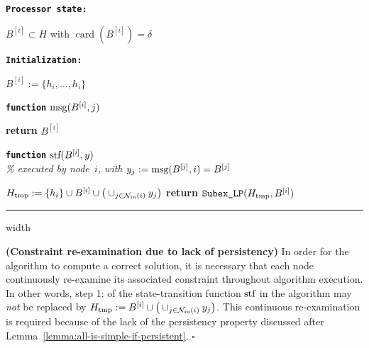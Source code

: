 \documentclass[onecolumn,journal,letterpaper]{IEEEtran}
\newcommand{\subscr}[2]{{#1}_{\textup{#2}}}
\newcommand{\union}{\cup}
\newcommand{\algofont}[1]{{\small\textsc{#1}}}
\newcommand{\card}{\ensuremath{\operatorname{card}}}
\newcommand{\subexLP}{\textup{\texttt{SUBEX\_lp}}}
\renewcommand{\subexLP}{\textup{\texttt{Subex\_LP}}}
\newcommand{\innbrs}{\subscr{\mathcal{N}}{in}}
\newcommand{\supind}[2]{{#1}^{[#2]}}
\newcommand{\msg}{\textup{msg}}
\newcommand{\stf}{\textup{stf}}
\newcommand\oprocendsymbol{\hbox{$\square$}}
\newcommand\oprocend{\relax\ifmmode\else\unskip\hfill\fi\oprocendsymbol}
\begin{document}
\noindent\begin{minipage}{0.44\linewidth}\textbf{\texttt{Processor state:}}\end{minipage}\begin{minipage}{0.56\linewidth}$\supind{B}{i}\subset H$ with
  $\card(\supind{B}{i})=\delta$\end{minipage}

\noindent\begin{minipage}{0.44\linewidth}\textbf{\texttt{Initialization:}}\end{minipage}\begin{minipage}{0.56\linewidth}$\supind{B}{i} := \{h_i,\dots,h_i\}$\end{minipage}

\bigskip

\noindent\textbf{\texttt{function}}  $\msg(\supind{B}{i}, j)$
\begin{algorithmic}[1]
  \STATE \textbf{return} $\supind{B}{i}$
\end{algorithmic}

\medskip

\noindent\textbf{\texttt{function}}  $\stf(\supind{B}{i}, y)$ \\
\emph{\% executed by node~$i$, with $y_j := \msg(\supind{B}{j},i)=\supind{B}{j}$}\\[-1.9em]
\begin{algorithmic}[1]
  \STATE $\subscr{H}{tmp} := \{h_i\} \union \supind{B}{i} \union \big(
  \union_{j\in \innbrs(i)} y_j \big)$
  \STATE \textbf{return} $\subexLP( \subscr{H}{tmp}, \supind{B}{i})$
\end{algorithmic}

\smallskip \hrule width \linewidth \medskip


\begin{remark}\textbf{\textup{(Constraint re-examination due to lack of persistency)}}
  In order for the algorithm to compute a correct solution, it is necessary
  that each node continuously re-examine its associated constraint
  throughout algorithm execution. In other words, step \algofont{1:} of the
  state-transition function $\stf$ in the algorithm may \emph{not} be
  replaced by $\subscr{H}{tmp} := \supind{B}{i} \union \big( \union_{j\in
    \innbrs(i)} y_j \big)$.  This continuous re-examination is required
  because of the lack of the persistency property discussed after
  Lemma~\ref{lemma:all-is-simple-if-persistent}.  \oprocend
\end{remark}
\end{document}
